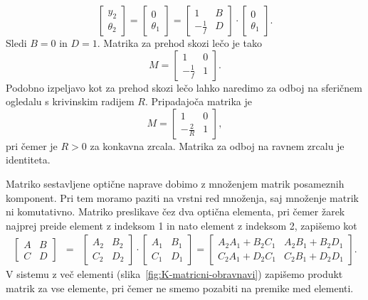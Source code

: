\begin{equation}
\left[\begin{array}{c}
y_{2}\\
\theta_{2}
\end{array}\right]=\left[\begin{array}{c}
0\\
\theta_{1}
\end{array}\right]=\left[\begin{array}{cc}
1 & B\\
-\frac{1}{f} & D
\end{array}\right]\cdot\left[\begin{array}{c}
0\\
\theta_{1}
\end{array}\right].
\end{equation}
 Sledi $B=0$ in $D=1$. Matrika za prehod skozi lečo je tako 
\begin{equation}
M= \left[\begin{array}{cc}
1 & 0\\
-\frac{1}{f} & 1
\end{array}\right].
\end{equation}
Podobno izpeljavo kot za prehod skozi lečo lahko naredimo za odboj na sferičnem ogledalu 
s krivinskim radijem $R$. Pripadajoča matrika je 
\begin{equation}
M=\left[\begin{array}{cc}
1 & 0\\
-\frac{2}{R} & 1
\end{array}\right],
\end{equation}
pri čemer je $R>0$ za konkavna zrcala. Matrika za odboj na ravnem zrcalu je identiteta.


Matriko sestavljene optične naprave dobimo z množenjem matrik posameznih komponent. 
Pri tem moramo paziti na vrstni red množenja, saj množenje matrik ni komutativno.
Matriko preslikave čez dva optična elementa, pri čemer žarek 
najprej preide element z indeksom 1 in nato element z indeksom 2, zapišemo kot 
\begin{eqnarray}
\left[\begin{array}{cc}
A & B\\
C & D
\end{array}\right] & = & \left[\begin{array}{cc}
A_{2} & B_{2}\\
C_{2} & D_{2}
\end{array}\right]\cdot\left[\begin{array}{cc}
A_{1} & B_{1}\\
C_{1} & D_{1}
\end{array}\right]=\left[\begin{array}{cc}
A_{2}A_{1}+B_{2}C_{1} & A_{2}B_{1}+B_{2}D_{1}\\
C_{2}A_{1}+D_{2}C_{1} & C_{2}B_{1}+D_{2}D_{1}
\end{array}\right].
\end{eqnarray}
V sistemu z več elementi (slika~\ref{fig:K-matricni-obravnavi}) zapišemo
produkt matrik za vse elemente, pri čemer ne smemo pozabiti na premike med
elementi.


